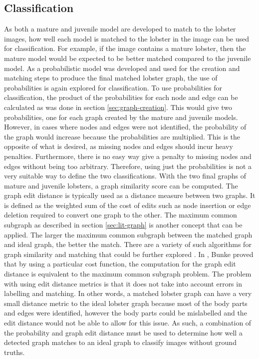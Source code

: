\subsection{Classification}
As both a mature and juvenile model are developed to match to the lobster images, how well each model is matched to the lobster in the image can be used for classification. For example, if the image contains a mature lobster, then the mature model would be expected to be better matched compared to the juvenile model. 
\n
As a probabilistic model was developed and used for the creation and matching steps to produce the final matched lobster graph, the use of probabilities is again explored for classification. To use probabilities for classification, the product of the probabilities for each node and edge can be calculated as was done in section \ref{sec:graph-creation}. This would give two probabilities, one for each graph created by the mature and juvenile models. However, in cases where nodes and edges were not identified, the probability of the graph would increase because the probabilities are multiplied. This is the opposite of what is desired, as missing nodes and edges should incur heavy penalties. Furthermore, there is no easy way give a penalty to missing nodes and edges without being too arbitrary. Therefore, using just the probabilities is not a very suitable way to define the two classifications.
\n
With the two final graphs of mature and juvenile lobsters, a graph similarity score can be computed. The graph edit distance is typically used as a distance measure between two graphs. It is defined as the weighted sum of the cost of edits such as node insertion or edge deletion required to convert one graph to the other. The maximum common subgraph as described in section \ref{sec:lit-graph} is another concept that can be applied. The larger the maximum common subgraph between the matched graph and ideal graph, the better the match. There are a variety of such algorithms for graph similarity and matching that could be further explored \cite{graph-similarity}. In \cite{graph-edit}, Bunke proved that by using a particular cost function, the computation for the graph edit distance is equivalent to the maximum common subgraph problem. The problem with using edit distance metrics is that it does not take into account errors in labelling and matching. In other words, a matched lobster graph can have a very small distance metric to the ideal lobster graph because most of the body parts and edges were identified, however the body parts could be mislabelled and the edit distance would not be able to allow for this issue. 
\n
As such, a combination of the probability and graph edit distance must be used to determine how well a detected graph matches to an ideal graph to classify images without ground truths. 

